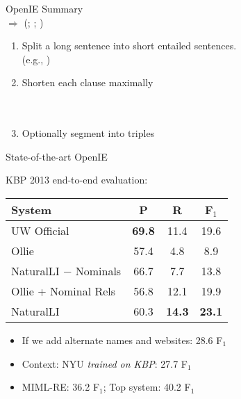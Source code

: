 \begin{frame}{OpenIE Summary}
 \\
  \hspace{2em}$\Rightarrow$ (; ; )
\vspace{2em}

\begin{enumerate}
  \item Split a long sentence into short entailed sentences. \\
        (e.g., )
  \vspace{1em}
  \pause

  \item Shorten each clause maximally\\
        \checkmark \hspace{1em}  \\
        \checkmark \hspace{1em}  \\
        \xmark \hspace{1em} 
  \vspace{1em}
  \pause
  
  \item Optionally segment into triples \\
\end{enumerate}
\end{frame}


\begin{frame}{State-of-the-art OpenIE}

KBP 2013 end-to-end evaluation:

\begin{center}
\begin{tabular}{l|cc:c}
\textbf{System} & \textbf{P} & \textbf{R} & \textbf{F$_1$} \\
\hline
UW Official            & \textbf{69.8} & 11.4   & 19.6 \\
\hline
Ollie                  & 57.4 & 4.8             & 8.9  \\
NaturalLI $-$ Nominals & 66.7 & 7.7             & 13.8 \\
\hline
Ollie + Nominal Rels   & 56.8 & 12.1            & 19.9 \\
NaturalLI              & 60.3 & \textbf{14.3}   & \textbf{23.1} \\
\end{tabular}
\end{center}
\pause
\vspace{2em}

\begin{itemize}
  \item If we add alternate names and websites: 28.6 F$_1$
  \item Context: NYU \textit{trained on KBP}: 27.7 F$_1$
  \pause
  \item MIML-RE: 36.2 F$_1$; Top system: 40.2 F$_1$
\end{itemize}
\end{frame}
